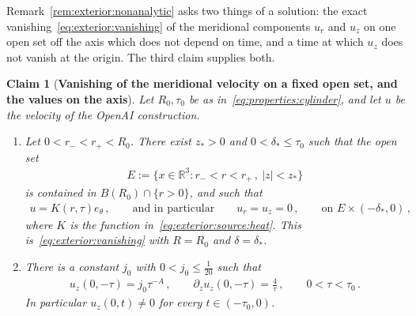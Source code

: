 \documentclass[11pt,reqno]{amsproc}
\numberwithin{equation}{section}
\newtheorem{claim}[theorem]{Claim}
\theoremstyle{remark}
\newcommand{\p}{\partial}
\newcommand{\RR}{\mathbb R}
\begin{document}
Remark~\ref{rem:exterior:nonanalytic} asks two things of a solution: the exact vanishing~\eqref{eq:exterior:vanishing} of the meridional components $u_r$ and $u_z$ on one open set off the axis which does not depend on time, and a time at which $u_z$ does not vanish at the origin. The third claim supplies both.

\begin{claim}[{\bf Vanishing of the meridional velocity on a fixed open set, and the values on the axis}]
\label{claim:exterior}
Let $R_0,\tau_0$ be as in~\eqref{eq:properties:cylinder}, and let $u$ be the velocity of the OpenAI construction.
\begin{enumerate}[label=(\alph*),leftmargin=2em]
\item Let $0<r_-<r_+<R_0$. There exist $z_*>0$ and $0<\delta_*\le\tau_0$ such that the open set
\begin{align*}
E:=\{x\in\RR^3\colon r_-<r<r_+\,,\ |z|<z_*\}
\end{align*}
is contained in $B(R_0)\cap\{r>0\}$, and such that
\begin{align*}
u=K(r,\tau)e_\theta
\,,\qquad\mbox{and in particular}\qquad
u_r=u_z=0
\,,\qquad\mbox{on }E\times(-\delta_*,0)
\,,
\end{align*}
where $K$ is the function in~\eqref{eq:exterior:source:heat}. This is~\eqref{eq:exterior:vanishing} with $R=R_0$ and $\delta=\delta_*$.
\item There is a constant $j_0$ with $0<j_0\le\frac1{20}$ such that
\begin{align}
u_z(0,-\tau)=j_0\tau^{-A}
\,,\qquad
\p_zu_z(0,-\tau)=\frac4\tau
\,,\qquad
0<\tau<\tau_0
\,.
\label{eq:properties:axis}
\end{align}
In particular $u_z(0,t)\ne0$ for every $t\in(-\tau_0,0)$.
\end{enumerate}
\end{claim}
\end{document}
